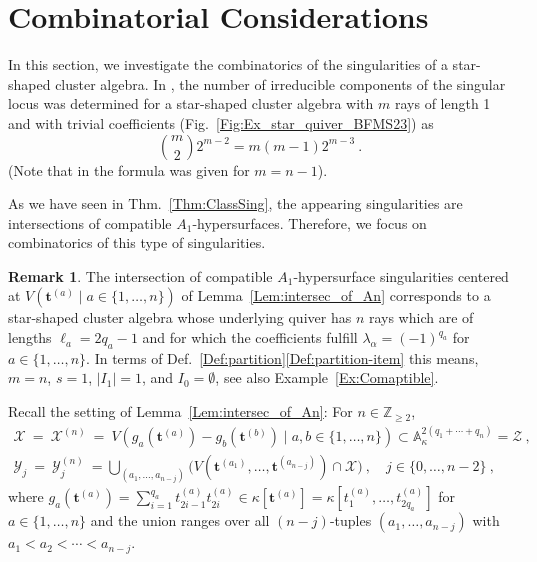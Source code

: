 \documentclass[letter,11pt]{amsart}
\renewcommand{\AA}{\ensuremath{\mathbb{A}}}
\newcommand{\ZZ}{\ensuremath{\mathbb{Z}}}
\renewcommand{\t}{\boldsymbol{t}}
\theoremstyle{theorem}
\theoremstyle{definition}
\newtheorem{Bem}[Thm]{Remark}
\newcommand{\len}{\ell}
\numberwithin{equation}{section}
\begin{document}
\section{Combinatorial Considerations}
\label{Sec:Combi}

In this section, we investigate the combinatorics of the singularities of a star-shaped cluster algebra. 
In \cite{BFMS23}, the number of irreducible components of the singular locus was determined for a star-shaped cluster algebra with $ m $ rays of length 1 and with trivial coefficients (Fig.~\ref{Fig:Ex_star_quiver_BFMS23}) as
\[  
	\binom{m}{2} 2^{m-2} = m(m-1) 2^{m-3} \ . 
\]
(Note that in \cite[Thm.~6.3]{BFMS23} the formula was given for $ m = n-1 $).

As we have seen in Thm.~\ref{Thm:ClassSing},
the appearing singularities are intersections of compatible $ A_1 $-hypersurfaces.
Therefore, we focus on combinatorics of this type of singularities.

\begin{Bem}
	The intersection of compatible $ A_1$-hypersurface singularities centered at $ V (\t^{(a)} \mid a \in \{ 1, \ldots, n \}) $ of Lemma~\ref{Lem:intersec_of_An} corresponds
	to a star-shaped cluster algebra 
	whose underlying quiver has $ n $ rays which are of lengths $ \len_a = 2 q_a - 1 $ 
	and for which the coefficients fulfill $ \lambda_\alpha = (-1)^{q_a} $
	for $ a \in \{ 1, \ldots, n \} $.
	In terms of Def.~\ref{Def:partition}\eqref{Def:partition-item} this means, $ m =n $, $ s = 1 $, $ |I_1| = 1 $, and $ I_0 = \emptyset $, see also Example~\ref{Ex:Comaptible}.
\end{Bem} 


Recall the setting of Lemma~\ref{Lem:intersec_of_An}:
For $ n \in \ZZ_{\geq 2} $, 
\[
\begin{array}{l}  
	\displaystyle 
	\mathcal{X} \ = \  \mathcal{X}^{(n)} \ =  \ V ( g_a (\t^{(a)}) - g_b (\t^{(b)}) \mid a, b \in \{ 1, \ldots, n\} )
	\subset \AA_\kappa^{2(q_1+ \cdots + q_n)} = \mathcal{Z}
	\ ,  
	\\[5pt]
	\displaystyle 
	\mathcal{Y}_j 
	\ = \
	\mathcal{Y}_j^{(n)} 
	\ = 
	\bigcup_{(a_1, \ldots, a_{n-j})}
	\Big( V(\t^{(a_1)}, \ldots, \t^{(a_{n-j})}) \cap \mathcal{X} \Big)  
	\ , 
	\quad j \in \{ 0, \ldots, n - 2 \} 
	\ , 
\end{array} 
\]
where
$
g_a (\t^{(a)}) = \sum_{i=1}^{q_a} t_{2i-1}^{(a)} t_{2i}^{(a)} \in \kappa [\t^{(a)}] = \kappa [t_1^{(a)}, \ldots, t_{2q_a}^{(a)}] $
for $ a \in \{ 1, \ldots, n \} $
and the union ranges over all $ (n-j) $-tuples $ (a_1, \ldots, a_{n-j}) $
with $ a_1 < a_2 < \cdots < a_{n-j} $. 
\end{document}
